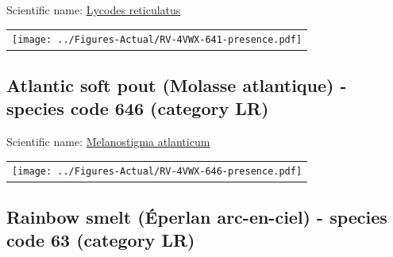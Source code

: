 \documentclass[12pt]{article}\usepackage[]{graphicx}\usepackage[]{color}
\begin{document}

Scientific name: \href{http://www.marinespecies.org/aphia.php?p=taxdetails\&id=127112}{Lycodes reticulatus} \newline
\begin{minipage}{1.0\textwidth}
 \begin{tabular}{c}
\texttt{[image: ../Figures-Actual/RV-4VWX-641-presence.pdf]} \\ 
\end{tabular} 
\end{minipage}
\clearpage

\renewcommand\thefigure{\thesubsection\Alph{figure}}

\setcounter{figure}{0}

\hypertarget{sec:646}{%
\subsection{Atlantic soft pout (Molasse atlantique) - species code 646 (category LR)}\label{sec:646}}

  


Scientific name: \href{http://www.marinespecies.org/aphia.php?p=taxdetails\&id=127120}{Melanostigma atlanticum} \newline
\begin{minipage}{1.0\textwidth}
 \begin{tabular}{c}
\texttt{[image: ../Figures-Actual/RV-4VWX-646-presence.pdf]} \\ 
\end{tabular} 
\end{minipage}
\clearpage

\renewcommand\thefigure{\thesubsection\Alph{figure}}

\setcounter{figure}{0}

\hypertarget{sec:63}{%
\subsection{Rainbow smelt (Éperlan arc-en-ciel) - species code 63 (category LR)}\label{sec:63}}

  
\end{document}
